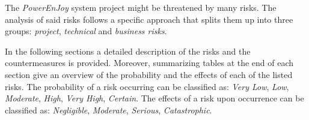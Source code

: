 
The \emph{PowerEnJoy} system project might be threatened by many risks. The analysis of said risks follows a specific approach that splits them up into three groups: \textit{project}, \textit{technical} and \textit{business risks}. 

In the following sections a detailed description of the risks and the countermeasures is provided. Moreover, summarizing tables at the end of each section give an overview of the probability and the effects of each of the listed risks. The probability of a risk occurring can be classified as: \textit{Very Low}, \textit{Low}, \textit{Moderate}, \textit{High}, \textit{Very High}, \textit{Certain}. The effects of a risk upon occurrence can be classified as: \textit{Negligible}, \textit{Moderate}, \textit{Serious}, \textit{Catastrophic}.

